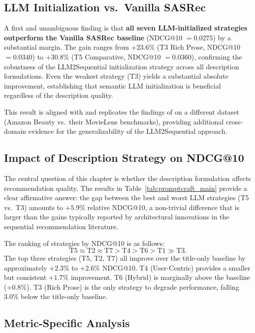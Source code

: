 \documentclass[12pt,a4paper]{report}
\newcommand{\textcite}[1]{\citet{#1}}
\begin{document}
\subsection{LLM Initialization vs.\ Vanilla SASRec}

A first and unambiguous finding is that \textbf{all seven
LLM-initialized strategies outperform the Vanilla SASRec
baseline} (NDCG@10 $= 0.0275$) by a substantial margin.
The gain ranges from $+23.6\%$ (T3 Rich Prose,
NDCG@10 $= 0.0340$) to $+30.8\%$ (T5 Comparative,
NDCG@10 $= 0.0360$), confirming the robustness of the
LLM2Sequential initialization strategy across all
description formulations. Even the weakest strategy (T3)
yields a substantial absolute improvement, establishing
that semantic LLM initialization is beneficial regardless
of the description quality.

This result is aligned with and replicates the findings of
\textcite{boz2025improving} on a different dataset (Amazon
Beauty vs.\ their MovieLens benchmarks), providing additional
cross-domain evidence for the generalizability of the
LLM2Sequential approach.

\subsection{Impact of Description Strategy on NDCG@10}

The central question of this chapter is whether the description
formulation affects recommendation quality. The results in
Table~\ref{tab:promptcraft_main} provide a clear affirmative
answer: the gap between the best and worst LLM strategies
(T5 vs.\ T3) amounts to $+5.9\%$ relative NDCG@10, a
non-trivial difference that is larger than the gains typically
reported by architectural innovations in the sequential
recommendation literature.

The ranking of strategies by NDCG@10 is as follows:
\[
  \text{T5} \approx \text{T2} \approx \text{T7} > \text{T4} > \text{T6} > \text{T1} \gg \text{T3}.
\]
The top three strategies (T5, T2, T7) all improve over the
title-only baseline by approximately $+2.3\%$ to $+2.6\%$
NDCG@10. T4 (User-Centric) provides a smaller but consistent
$+1.7\%$ improvement. T6 (Hybrid) is marginally above the
baseline ($+0.8\%$). T3 (Rich Prose) is the only strategy
to degrade performance, falling $3.0\%$ below the title-only
baseline.

\subsection{Metric-Specific Analysis}
\end{document}
